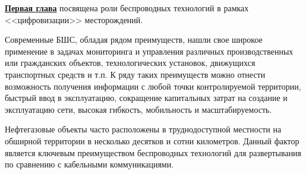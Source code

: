 




\underline{\textbf{Первая глава}} посвящена роли беспроводных технологий в рамках <<цифровизации>> месторождений. 

Современные БШС, обладая рядом преимуществ, нашли свое широкое применение в задачах мониторинга и управления различных производственных или гражданских объектов, техно­логических установок, движущихся транспортных средств и т.п. К ряду таких преимуществ можно отнести возможность получения информации с любой точ­ки контролируемой территории, быстрый ввод в эксплуатацию, сокращение капитальных затрат на создание и эксплуатацию сети, высокая гибкость, мо­бильность и масштабируемость. 


Нефтегазовые объекты часто расположены в труднодоступной местности на обширной территории в несколько десятков и сотни километров. Данный фактор является ключевым преимуществом беспроводных технологий для развертывания по сравнению с кабельными коммуникациями. 


